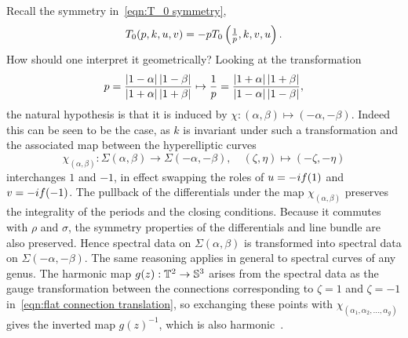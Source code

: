 \documentclass{article}
\begin{document}
Recall the symmetry in~\eqref{eqn:T_0 symmetry},
\[
T_0(p,k,u,v) = -p T_0\bra{ \tfrac{1}{p}, k, v, u }.
\]
How should one interpret it geometrically? Looking at the transformation
\[
p = \frac{\abs{1-\alpha}\abs{1-\beta}}{\abs{1+\alpha}\abs{1+\beta}}
\mapsto \frac{1}{p} = \frac{\abs{1+\alpha}\abs{1+\beta}}{\abs{1-\alpha}\abs{1-\beta}},
\]
the natural hypothesis is that it is induced by $\chi:(\alpha,\beta)\mapsto (-\alpha,-\beta)$.
Indeed this can be seen to be the case, as $k$ is invariant under such a transformation and the associated map between the hyperelliptic curves
\[
\chi_{(\alpha,\beta)}: \Sigma(\alpha,\beta) \to \Sigma(-\alpha,-\beta),
\quad (\zeta, \eta) \mapsto (-\zeta,-\eta)
\]
interchanges $1$ and $-1$, in effect swapping the roles of $u = -\iu f(1)$ and $v = -\iu f(-1)$. The pullback of the differentials under the map $\chi_{(\alpha,\beta)}$ preserves the integrality of the periods and the closing conditions. Because it commutes with $\rho$ and $\sigma$, the symmetry properties of the differentials and line bundle are also preserved. Hence spectral data on $\Sigma(\alpha,\beta)$ is transformed into spectral data on $\Sigma(-\alpha,-\beta)$.
The same reasoning applies in general to spectral curves of any genus.
The harmonic map $g(z) : \mathbb{T}^2 \to \S^3$ arises from the spectral data as the gauge transformation between the connections corresponding to $\zeta=1$ and $\zeta=-1$ in~\eqref{eqn:flat connection translation}, so exchanging these points with $\chi_{(\alpha_1,\alpha_2,\dots,\alpha_g)}$ gives the inverted map $g(z)^{-1}$, which is also harmonic~\cite[Prop~8.2]{Uhlenbeck1989}.
\end{document}
